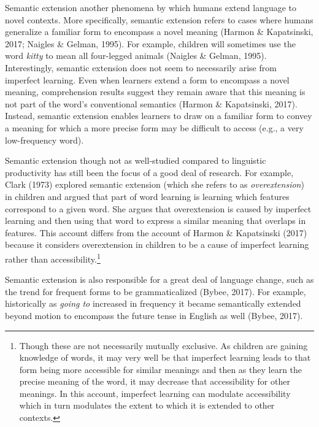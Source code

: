 \documentclass[
  letterpaper,
  DIV=11,
  numbers=noendperiod]{scrartcl}
\begin{document}
Semantic extension another phenomena by which humans extend language to
novel contexts. More specifically, semantic extension refers to cases
where humans generalize a familiar form to encompass a novel meaning
(Harmon \& Kapatsinski, 2017; Naigles \& Gelman, 1995). For example,
children will sometimes use the word \emph{kitty} to mean all
four-legged animals (Naigles \& Gelman, 1995). Interestingly, semantic
extension does not seem to necessarily arise from imperfect learning.
Even when learners extend a form to encompass a novel meaning,
comprehension results suggest they remain aware that this meaning is not
part of the word's conventional semantics (Harmon \& Kapatsinski, 2017).
Instead, semantic extension enables learners to draw on a familiar form
to convey a meaning for which a more precise form may be difficult to
access (e.g., a very low-frequency word).

Semantic extension though not as well-studied compared to linguistic
productivity has still been the focus of a good deal of research. For
example, Clark (1973) explored semantic extension (which she refers to
as \emph{overextension}) in children and argued that part of word
learning is learning which features correspond to a given word. She
argues that overextension is caused by imperfect learning and then using
that word to express a similar meaning that overlaps in features. This
account differs from the account of Harmon \& Kapatsinski (2017) because
it considers overextension in children to be a cause of imperfect
learning rather than accessibility.\footnote{Though these are not
  necessarily mutually exclusive. As children are gaining knowledge of
  words, it may very well be that imperfect learning leads to that form
  being more accessible for similar meanings and then as they learn the
  precise meaning of the word, it may decrease that accessibility for
  other meanings. In this account, imperfect learning can modulate
  accessibility which in turn modulates the extent to which it is
  extended to other contexts.}

Semantic extension is also responsible for a great deal of language
change, such as the trend for frequent forms to be grammaticalized
(Bybee, 2017). For example, historically as \emph{going to} increased in
frequency it became semantically extended beyond motion to encompass the
future tense in English as well (Bybee, 2017).
\end{document}
